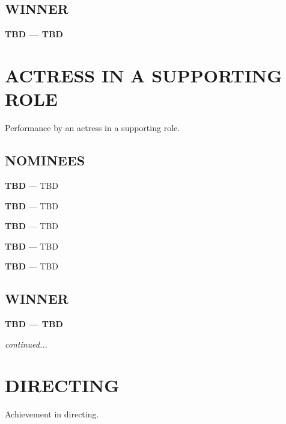 \documentclass[letterpaper]{extarticle}
\begin{document}
  \subsection*{{\selectfont WINNER}}
  \textcolor{oscaryellow}{\textbf{{\selectfont TBD} — TBD}}

  \section*{\textcolor{oscaryellow}{{\selectfont ACTRESS IN A SUPPORTING ROLE}}}
  \vspace{-6pt}
  {\selectfont Performance by an actress in a supporting role.}
  \subsection*{{\selectfont NOMINEES}}
  \begin{multicols}{2}
    \begin{itemize}
      \begin{small}
        \item \textbf{{\selectfont TBD}} — TBD
        \item \textbf{{\selectfont TBD}} — TBD
        \item \textbf{{\selectfont TBD}} — TBD
        \item \textbf{{\selectfont TBD}} — TBD
        \item \textbf{{\selectfont TBD}} — TBD
      \end{small}
    \end{itemize}
  \end{multicols}

  \subsection*{{\selectfont WINNER}}
  \textcolor{oscaryellow}{\textbf{{\selectfont TBD} — TBD}}

  \mbox{}
  \vfill
  \textit{continued...}

  \newpage

  \section*{\textcolor{oscaryellow}{{\selectfont DIRECTING}}}
  \vspace{-6pt}
  {\selectfont Achievement in directing.}
\end{document}
